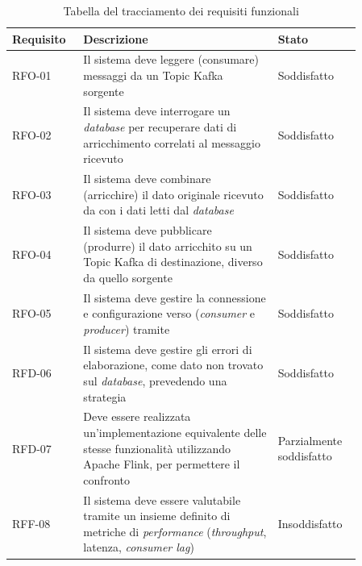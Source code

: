 \begin{table}[H]
\setlength{\tabcolsep}{10pt} %
\def\arraystretch{1.5} %
\centering
\begin{tabular}{|p{0.16\linewidth}|p{0.50\linewidth}|p{0.2\linewidth}|}
\hline
\textbf{Requisito} & \textbf{Descrizione} & \textbf{Stato} \\ \hline
RFO-01 & Il sistema deve leggere (consumare) messaggi da un \gls{Topic Kafka} sorgente & Soddisfatto \\ \hline
RFO-02 & Il sistema deve interrogare un \textit{database} per recuperare dati di arricchimento correlati al messaggio ricevuto & Soddisfatto \\ \hline
RFO-03 & Il sistema deve combinare (arricchire) il dato originale ricevuto da \nameref{Apache Kafka} con i dati letti dal \textit{database} & Soddisfatto \\ \hline
RFO-04 & Il sistema deve pubblicare (produrre) il dato arricchito su un \gls{Topic Kafka} di destinazione, diverso da quello sorgente & Soddisfatto \\ \hline
RFO-05 & Il sistema deve gestire la connessione e configurazione verso \nameref{Apache Kafka} (\textit{consumer} e \textit{producer}) tramite \nameref{Spring} & Soddisfatto \\ \hline
RFD-06 & Il sistema deve gestire gli errori di elaborazione, come dato non trovato sul \textit{database}, prevedendo una strategia & Soddisfatto \\ \hline
RFD-07 & Deve essere realizzata un'implementazione equivalente delle stesse funzionalità utilizzando Apache Flink, per permettere il confronto & Parzialmente soddisfatto \\ \hline
RFF-08 & Il sistema deve essere valutabile tramite un insieme definito di metriche di \textit{performance} (\textit{throughput}, latenza, \textit{consumer lag}) & Insoddisfatto \\ \hline
\end{tabular}
\caption{Tabella del tracciamento dei requisiti funzionali}
\label{Tabella del tracciamento dei requisiti funzionali}
\end{table}

